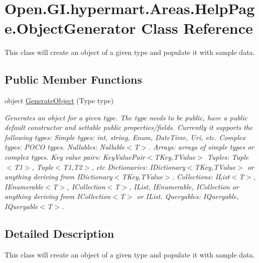 \hypertarget{class_open_1_1_g_i_1_1hypermart_1_1_areas_1_1_help_page_1_1_object_generator}{}\section{Open.\+G\+I.\+hypermart.\+Areas.\+Help\+Page.\+Object\+Generator Class Reference}
\label{class_open_1_1_g_i_1_1hypermart_1_1_areas_1_1_help_page_1_1_object_generator}


This class will create an object of a given type and populate it with sample data.  


\subsection*{Public Member Functions}
\begin{DoxyCompactItemize}
\item 
object \hyperlink{class_open_1_1_g_i_1_1hypermart_1_1_areas_1_1_help_page_1_1_object_generator_a118924d1ff5f565e6e9c2893d36f35d2}{Generate\+Object} (Type type)
\begin{DoxyCompactList}\small\item\em Generates an object for a given type. The type needs to be public, have a public default constructor and settable public properties/fields. Currently it supports the following types\+: Simple types\+: int, string, Enum, Date\+Time, Uri, etc. Complex types\+: P\+O\+C\+O types. Nullables\+: Nullable$<$\+T$>$. Arrays\+: arrays of simple types or complex types. Key value pairs\+: Key\+Value\+Pair$<$\+T\+Key,\+T\+Value$>$ Tuples\+: Tuple$<$\+T1$>$, Tuple$<$\+T1,\+T2$>$, etc Dictionaries\+: I\+Dictionary$<$\+T\+Key,\+T\+Value$>$ or anything deriving from I\+Dictionary$<$\+T\+Key,\+T\+Value$>$. Collections\+: I\+List$<$\+T$>$, I\+Enumerable$<$\+T$>$, I\+Collection$<$\+T$>$, I\+List, I\+Enumerable, I\+Collection or anything deriving from I\+Collection$<$\+T$>$ or I\+List. Queryables\+: I\+Queryable, I\+Queryable$<$\+T$>$. \end{DoxyCompactList}\end{DoxyCompactItemize}


\subsection{Detailed Description}
This class will create an object of a given type and populate it with sample data. 



